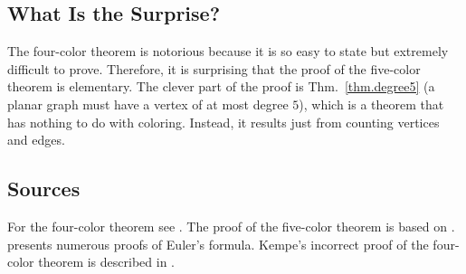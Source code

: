 \begin{figure}[ht]
{
}
\label{f.five-kempe2}
\label{f.five-kempe2-share}
\end{figure}

\clearpage

\subsection*{What Is the Surprise?}

The four-color theorem is notorious because it is so easy to state but extremely difficult to prove. Therefore, it is surprising that the proof of the five-color theorem is elementary. The clever part of the proof is Thm.~\ref{thm.degree5} (a planar graph must have a vertex of at most degree $5$), which is a theorem that has nothing to do with coloring. Instead, it results just from counting vertices and edges.

\subsection*{Sources}
For the four-color theorem see \cite{thomas,wiki:four}. The proof of the five-color theorem is based on \cite{thebook,wiki:five}.
\cite{eppstein} presents numerous proofs of Euler's formula. Kempe's incorrect proof of the four-color theorem is described in \cite{sipka}.

